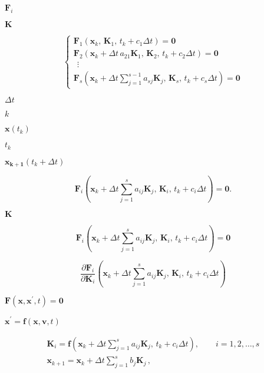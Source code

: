 \documentclass{article}
\begin{document}
$ \mathbf{F}_i $
\pagebreak

$ \mathbf{K}
$
\pagebreak

\[
\left\{\begin{array}{l}
\mathbf{F}_1 \left(
  \mathbf{x}_k, \, \mathbf{K}_1, \, t_k + c_1 \Delta t
\right) = \mathbf{0} \\
\mathbf{F}_2 \left(
  \mathbf{x}_k + \Delta t \, a_{21} \mathbf{K}_1, \,
  \mathbf{K}_2, \, t_k + c_2 \Delta t
\right) = \mathbf{0} \\
~~ \vdots \\
\mathbf{F}_s \left(
  \mathbf{x}_k + \Delta t \displaystyle\sum_{j=1}^{s-1} a_{sj}
  \mathbf{K}_j, \, \mathbf{K}_s, \, t_k + c_s \Delta t
\right) = \mathbf{0}
\end{array}\right.
\]
\pagebreak

$ \Delta t $
\pagebreak

$ k $
\pagebreak

$ \mathbf{x}(t_k) $
\pagebreak

$ t_k $
\pagebreak

$ \mathbf{x_{k+1}}(t_{k}+\Delta t) $
\pagebreak

\[
\mathbf{F}_i\left(\mathbf{x}_k + \Delta t \displaystyle\sum_{j=1}^{s}
  a_{ij} \mathbf{K}_j, \, \mathbf{K}_i, \, t_k + c_i \Delta t
\right) = \mathbf{0}.
\]
\pagebreak

$ \mathbf{K} $
\pagebreak

\[
\mathbf{F}_i\left(\mathbf{x}_k + \Delta t \displaystyle\sum_{j=1}^s
  a_{ij} \mathbf{K}_j, \, \mathbf{K}_i, \, t_k + c_i \Delta t
\right) = \mathbf{0}
\]
\pagebreak

\[
\dfrac{\partial \mathbf{F}_i}{\partial \mathbf{K}_i} \left(
  \mathbf{x}_k + \Delta t \displaystyle\sum_{j=1}^s a_{ij} \mathbf{K}_j,
  \, \mathbf{K}_i, \, t_k + c_i \Delta t
\right)
\]
\pagebreak

$ \mathbf{F}(\mathbf{x}, \mathbf{x}^{\prime}, t) =
\mathbf{0} $
\pagebreak

$ \mathbf{x}^{\prime} = \mathbf{f}(\mathbf{x}, \mathbf{v}, t) $
\pagebreak

\[
\begin{array}{l}
\mathbf{K}_i = \mathbf{f} \left(
  \mathbf{x}_k + \Delta t \displaystyle\sum_{j=1}^{s} a_{ij}
  \mathbf{K}_j,
  \, t_k + c_i \Delta t
  \right), \qquad i = 1, 2, \ldots, s \\
\mathbf{x}_{k+1} = \mathbf{x}_k + \Delta t \displaystyle\sum_{j=1}^s b_j
\mathbf{K}_j \, ,
\end{array}
\]
\pagebreak
\end{document}
